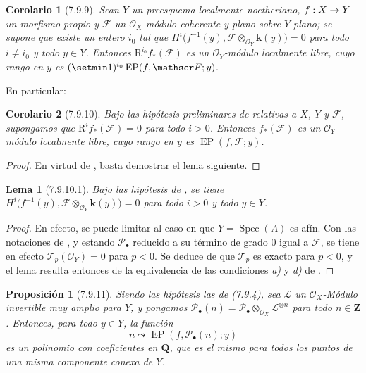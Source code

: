 \documentclass[10pt,oneside,openany]{book}
\theoremstyle{egaenv}\newtheorem*{env}{---}
\theoremstyle{egastatement}
\newtheorem*{proposition}{Proposición}
\newtheorem*{lemma}{Lema}
\newtheorem*{corollary}{Corolario}
\theoremstyle{egadescription}
\newcommand{\oldpage}[2][]{\marginnote{\normalfont\scriptsize\textbf{#1}\,|\,#2}\ignorespaces}
\renewcommand{\to}{\mathchoice{\longrightarrow}{\rightarrow}{\rightarrow}{\rightarrow}}
\begin{document}
\begin{corollary}[7.9.9]
\label{III.7.9.9}
\label{III.7.9.9.fr}
Sean $Y$ un preesquema localmente noetheriano,
$f:X\to Y$ un morfismo propio y $\mathscr F$ un
$\mathscr O_X$-módulo coherente y plano sobre $Y$-plano; se supone que existe un entero $i_0$ tal que
$H^i\bigl(f^{-1}(y),\mathscr F\otimes_{\mathscr O_Y}\boldsymbol{k}(y)\bigr)=0$
para todo $i\ne i_0$ y todo $y\in Y$. Entonces
$\mathrm R^{i_0}f_*(\mathscr F)$ es un $\mathscr O_Y$-módulo localmente
libre, cuyo rango en $y$ es
$(\setmin 1)^{i_0}\operatorname{EP}(f,\mathscr F;y)$.
\end{corollary}

En particular:

\begin{corollary}[7.9.10]
\label{III.7.9.10}
\label{III.7.9.10.fr}
Bajo las hipótesis preliminares de \textup{} relativas a
$X$, $Y$ y $\mathscr F$, supongamos que
$\mathrm R^if_*(\mathscr F)=0$ para todo $i>0$. Entonces
$f_*(\mathscr F)$ es un $\mathscr O_Y$-módulo localmente libre,
cuyo rango en $y$ es $\operatorname{EP}(f,\mathscr F;y)$.
\end{corollary}

\begin{proof}
En virtud de , basta demostrar el lema siguiente.
\end{proof}

\begin{lemma}[7.9.10.1]
\label{III.7.9.10.1}
\label{III.7.9.10.1.fr}
Bajo las hipótesis de \textup{}, se tiene
$H^i\bigl(f^{-1}(y),\mathscr F\otimes_{\mathscr O_Y}\boldsymbol{k}(y)\bigr)=0$
para todo $i>0$ y todo $y\in Y$.
\end{lemma}

\begin{proof}
En efecto, se puede limitar al caso en que $Y=\operatorname{Spec}(A)$ es afín.
Con las notaciones de , y estando
$\mathscr P_\bullet$ reducido a su término
de grado $0$ igual a $\mathscr F$, se tiene en efecto
$\mathscr T_p(\mathscr O_Y)=0$ para $p<0$. Se deduce de
 que $\mathscr T_p$ es exacto para $p<0$, y el
lema resulta entonces de la equivalencia de las condiciones \emph{a)} y
\emph{d)} de .
\end{proof}

\oldpage[III]{211}
\begin{proposition}[7.9.11]
\label{III.7.9.11.fr}
Siendo las hipótesis las de \textup{(7.9.4)}, sea $\mathscr L$ un
$\mathscr O_X$-Módulo invertible muy amplio para $Y$, y pongamos
$\mathscr P_\bullet(n)=\mathscr P_\bullet\otimes_{\mathscr O_X}
\mathscr L^{\otimes n}$ para todo $n\in\mathbf Z$. Entonces, para todo $y\in Y$,
la función
\[
  n\leadsto\operatorname{EP}(f,\mathscr P_\bullet(n);y)
  \tag{7.9.11.1}\label{III.7.9.11.1.fr}
\]
es un polinomio con coeficientes en $\mathbf Q$, que es el mismo para todos los
puntos de una misma componente conexa de $Y$.
\end{proposition}
\end{document}
